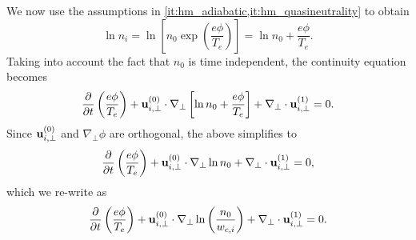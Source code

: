 \documentclass[11pt]{article}
\begin{document}
We now use the assumptions in \cref{it:hm_adiabatic,it:hm_quasineutrality} to obtain
\begin{equation}
    \ln n_i = \ln \left [ n_0 \exp \left ( \frac{e \phi}{T_e} \right ) \right ] = \ln n_0 + \frac{e \phi}{T_e}.
\end{equation}
Taking into account the fact that $n_0$ is time independent, the continuity equation becomes
\begin{equation}
    \frac{\partial}{\partial t} \left ( \frac{e\phi}{T_e} \right ) + \mathbf{u}^{(0)}_{i,\perp} \cdot \nabla_\perp \left [ \ln n_0 + \frac{e \phi}{T_e} \right ] +  \nabla_\perp \cdot \mathbf{u}^{(1)}_{i,\perp} = 0.
\end{equation}
Since $\mathbf{u}^{(0)}_{i,\perp}$ and $\nabla_\perp \phi$ are orthogonal, the above simplifies to
\begin{equation}
    \frac{\partial}{\partial t} \left ( \frac{e\phi}{T_e} \right ) + \mathbf{u}^{(0)}_{i,\perp} \cdot \nabla_\perp \ln n_0 +  \nabla_\perp \cdot \mathbf{u}^{(1)}_{i,\perp} = 0,
\end{equation}
which we re-write as
\begin{equation}
    \label{eq:intermediate_hm_2}
    \frac{\partial}{\partial t} \left ( \frac{e\phi}{T_e} \right ) + \mathbf{u}^{(0)}_{i,\perp} \cdot \nabla_\perp \ln \left ( \frac{n_0}{w_{c,i}} \right ) +  \nabla_\perp \cdot \mathbf{u}^{(1)}_{i,\perp} = 0.
\end{equation}
\end{document}

